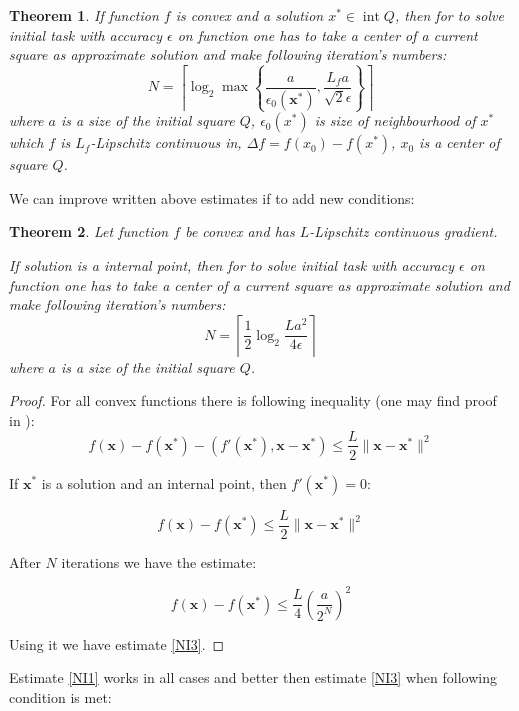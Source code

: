 \documentclass[12pt]{article}
\newtheorem{theorem}{Theorem}[section]
\DeclareMathOperator{\intt}{int}
\begin{document}
\begin{theorem}
If function $f$ is convex and a solution $x^*\in \intt Q$, then for to solve initial task with accuracy $\epsilon$ on function one has to take a center of a current square as approximate  solution and make following iteration's numbers:
\begin{equation}\label{NI2}
N = \left\lceil\log_2\max\left\{\frac{a}{\epsilon_0(\textbf{x}^*)},\frac{L_fa}{\sqrt{2}\epsilon}\right\}\right\rceil
\end{equation}
where $a$ is a size of the initial square $Q$, $\epsilon_0(x^*)$ is size of neighbourhood of $x^*$ which $f$ is $L_f$-Lipschitz continuous in, $\Delta f =  f(x_0) - f(x^*)$, $x_0$ is a center of square $Q$.
\end{theorem}

We can improve written above estimates if to add new conditions:

\begin{theorem}
Let function $f$ be convex and has $L$-Lipschitz continuous gradient.

If solution is a internal point, then for to solve initial task with accuracy $\epsilon$ on function one has to take a center of a current square as approximate  solution and make following iteration's numbers:
\begin{equation}\label{NI3}N = \left\lceil\frac{1}{2}\log_2\frac{La^2}{4\epsilon}\right\rceil\end{equation}
where $a$ is a size of the initial square $Q$.
\end{theorem}

\begin{proof}
For all convex functions there is following inequality (one may find proof in \cite{Nesterov}):
$$f(\textbf{x}) - f(\textbf{x}^*) - (f'(\textbf{x}^*), \textbf{x} - \textbf{x}^*) \leq \frac{L}{2}\|\textbf{x}-\textbf{x}^*\|^2$$

If $\textbf{x}^*$ is a solution and an internal point, then $f'(\textbf{x}^*) = 0$:

$$f(\textbf{x}) - f(\textbf{x}^*)\leq \frac{L}{2}\|\textbf{x}-\textbf{x}^*\|^2$$

After $N$ iterations we have the estimate:

$$f(\textbf{x}) - f(\textbf{x}^*)\leq \frac{L}{4}\left(\frac{a}{2^N}\right)^2$$

Using it we have estimate \eqref{NI3}.
\end{proof}

Estimate \ref{NI1} works in all cases and better then estimate \ref{NI3} when following condition is met:
\end{document}
